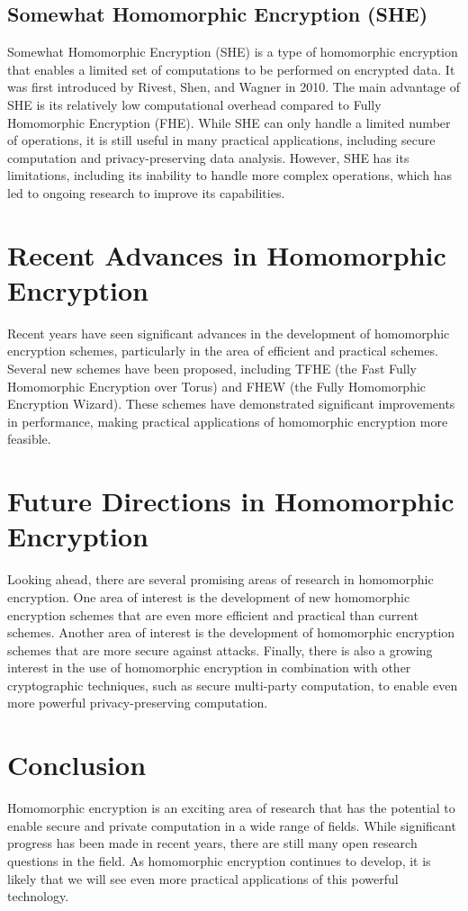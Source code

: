 \documentclass[a4paper,11pt]{report}
\begin{document}
\subsection{Somewhat Homomorphic Encryption (SHE)}
Somewhat Homomorphic Encryption (SHE) is a type of homomorphic encryption that enables a limited set of computations to be performed on encrypted data. It was first introduced by Rivest, Shen, and Wagner in 2010. The main advantage of SHE is its relatively low computational overhead compared to Fully Homomorphic Encryption (FHE). While SHE can only handle a limited number of operations, it is still useful in many practical applications, including secure computation and privacy-preserving data analysis. However, SHE has its limitations, including its inability to handle more complex operations, which has led to ongoing research to improve its capabilities.
\section{Recent Advances in Homomorphic Encryption}
Recent years have seen significant advances in the development of homomorphic encryption schemes, particularly in the area of efficient and practical schemes. Several new schemes have been proposed, including TFHE (the Fast Fully Homomorphic Encryption over Torus) and FHEW (the Fully Homomorphic Encryption Wizard). These schemes have demonstrated significant improvements in performance, making practical applications of homomorphic encryption more feasible.
\section{Future Directions in Homomorphic Encryption}
Looking ahead, there are several promising areas of research in homomorphic encryption. One area of interest is the development of new homomorphic encryption schemes that are even more efficient and practical than current schemes. Another area of interest is the development of homomorphic encryption schemes that are more secure against attacks. Finally, there is also a growing interest in the use of homomorphic encryption in combination with other cryptographic techniques, such as secure multi-party computation, to enable even more powerful privacy-preserving computation.

\section{Conclusion}
Homomorphic encryption is an exciting area of research that has the potential to enable secure and private computation in a wide range of fields. While significant progress has been made in recent years, there are still many open research questions in the field. As homomorphic encryption continues to develop, it is likely that we will see even more practical applications of this powerful technology.
\end{document}
